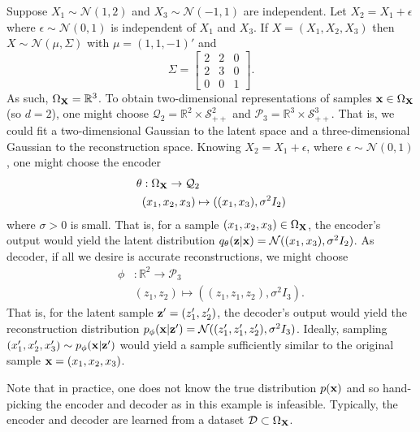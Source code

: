 \documentclass[11pt]{article}
\begin{document}
\begin{example}
    Suppose $X_1\sim\mathcal{N}(1,2)$ and $X_3\sim\mathcal{N}(-1,1)$ are independent. Let $X_2=X_1+\epsilon$ where $\epsilon\sim\mathcal{N}(0,1)$ is independent of $X_1$ and $X_3$. If $X=(X_1,X_2,X_3)$ then $X\sim\mathcal{N}(\mu,\Sigma)$ with $\mu=(1,1,-1)'$ and
    $$
    \Sigma
    =
    \begin{bmatrix}
        2 & 2 & 0\\
        2 & 3 & 0\\
        0 & 0 & 1
    \end{bmatrix}.
    $$
    As such, $\Omega_{\mathbf{X}}=\mathbb{R}^3$. To obtain two-dimensional representations of samples $\mathbf{x}\in\Omega_{\mathbf{X}}$ (so $d=2$), one might choose $\mathcal{Q}_2=\mathbb{R}^2\times\mathcal{S}_{++}^2$ and $\mathcal{P}_3=\mathbb{R}^3\times\mathcal{S}_{++}^3$. That is, we could fit a two-dimensional Gaussian to the latent space and a three-dimensional Gaussian to the reconstruction space. Knowing $X_2=X_1+\epsilon$, where $\epsilon\sim\mathcal{N}(0,1)$, one might choose the encoder
    \begin{align*}
        \theta&:
        \Omega_{\mathbf{X}}\to\mathcal{Q}_2\\
        &(x_1,x_2,x_3)\mapsto((x_1,x_3),\sigma^2I_2)
    \end{align*}
    where $\sigma>0$ is small. That is, for a sample $(x_1,x_2,x_3)\in\Omega_{\mathbf{X}}$, the encoder's output would yield the latent distribution $q_{\theta}(\mathbf{z}|\mathbf{x})=\mathcal{N}((x_1,x_3),\sigma^2I_2)$. As decoder, if all we desire is accurate reconstructions, we might choose
    \begin{align*}
        \phi&:
        \mathbb{R}^2\to\mathcal{P}_3\\
        &(z_1,z_2)\mapsto((z_1,z_1,z_2), \sigma^2I_3).
    \end{align*}
    That is, for the latent sample $\mathbf{z}'=(z_1',z_2')$, the decoder's output would yield the reconstruction distribution $p_{\phi}(\mathbf{x}|\mathbf{z}')=\mathcal{N}((z_1',z_1',z_2'),\sigma^2I_3)$. Ideally, sampling $(x_1',x_2',x_3')\sim p_{\phi}(\mathbf{x}|\mathbf{z}')$ would yield a sample sufficiently similar to the original sample $\mathbf{x}=(x_1,x_2,x_3)$.

    Note that in practice, one does not know the true distribution $p(\mathbf{x})$ and so hand-picking the encoder and decoder as in this example is infeasible. Typically, the encoder and decoder are learned from a dataset $\mathcal{D}\subset\Omega_{\mathbf{X}}$.
\end{example}
\end{document}
